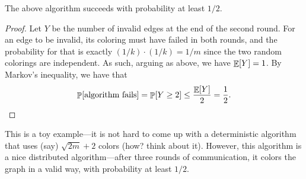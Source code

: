 \begin{lemma}
    The above algorithm succeeds with probability at least $1/2$.
\end{lemma}
\begin{proof}
    Let $Y$ be the number of invalid edges at the end of the second
    round. For an edge to be invalid, its coloring must have failed in
    both rounds, and the probability for that is exactly
    $(1/k)\cdot(1/k) = 1/m$ since the two random colorings are
    independent. As such, arguing as above, we have $\mathop{\mathbb{E}}\!\left[ {Y} \right] =1$. By
    Markov's inequality, we have that
    \begin{equation*}
        \Prob{\text{algorithm fails}}
        =
        \Prob{Y \geq 2 }
        \leq
        \frac{\Ex{Y}}{2}
        =%
        \frac{1}{2}.
    \end{equation*}
\end{proof}

\begin{remark}
    This is a toy example---it is not hard to come up with a deterministic
    algorithm that uses (say) $\sqrt{2m} + 2$ colors (how?  think about
    it). However, this algorithm is a nice distributed algorithm---after
    three rounds of communication, it colors the graph in a valid way,
    with probability at least $1/2$.
\end{remark}








\ChapterEnd{}



